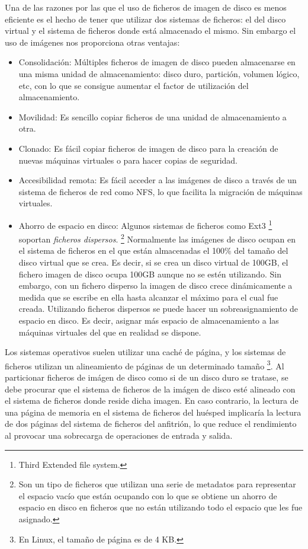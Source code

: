 \documentclass[spanisheDIVcalc,twoside,parskip-,pointlessnumbers,final]{scrbook}
\begin{document}
Una de las razones por las que el uso de ficheros de imagen de disco
es menos eficiente es el hecho de tener que utilizar dos sistemas
de ficheros: el del disco virtual y el sistema de ficheros donde está
almacenado el mismo. Sin embargo el uso de imágenes nos proporciona
otras ventajas:
\begin{itemize}
\item Consolidación: Múltiples ficheros de imagen de disco pueden almacenarse
en una misma unidad de almacenamiento: disco duro, partición, volumen
lógico, etc, con lo que se consigue aumentar el factor de utilización
del almacenamiento.
\item Movilidad: Es sencillo copiar ficheros de una unidad de almacenamiento
a otra.
\item Clonado: Es fácil copiar ficheros de imagen de disco para la creación
de nuevas máquinas virtuales o para hacer copias de seguridad.
\item Accesibilidad remota: Es fácil acceder a las imágenes de disco a través
de un sistema de ficheros de red como NFS, lo que facilita la migración
de máquinas virtuales.
\item Ahorro de espacio en disco: Algunos sistemas de ficheros como Ext3%
\footnote{Third Extended file system.%
} soportan \emph{ficheros dispersos}.%
\footnote{Son un tipo de ficheros que utilizan una serie de metadatos para representar
el espacio vacío que están ocupando con lo que se obtiene un ahorro
de espacio en disco en ficheros que no están utilizando todo el espacio
que les fue asignado.%
} Normalmente las imágenes de disco ocupan en el sistema de ficheros
en el que están almacenadas el 100\% del tamaño del disco virtual
que se crea. Es decir, si se crea un disco virtual de 100GB, el fichero
imagen de disco ocupa 100GB aunque no se estén utilizando. Sin embargo,
con un fichero disperso la imagen de disco crece dinámicamente a medida
que se escribe en ella hasta alcanzar el máximo para el cual fue creada.
Utilizando ficheros dispersos se puede hacer un sobreasignamiento
de espacio en disco. Es decir, asignar más espacio de almacenamiento
a las máquinas virtuales del que en realidad se dispone.
\end{itemize}
Los sistemas operativos suelen utilizar una caché de página, y los
sistemas de ficheros utilizan un alineamiento de páginas de un determinado
tamaño%
\footnote{En Linux, el tamaño de página es de 4 KB.%
}. Al particionar ficheros de imágen de disco como si de un disco duro
se tratase, se debe procurar que el sistema de ficheros de la imágen
de disco esté alineado con el sistema de ficheros donde reside dicha
imagen. En caso contrario, la lectura de una página de memoria en
el sistema de ficheros del huésped implicaría la lectura de dos páginas
del sistema de ficheros del anfitrión, lo que reduce el rendimiento
al provocar una sobrecarga de operaciones de entrada y salida.
\end{document}
